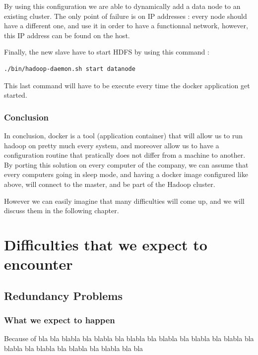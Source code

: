 \documentclass[11pt]{report} %
\begin{document}
By using this configuration we are able to dynamically add a data node to an existing cluster. The only point of failure is on IP addresses : every node should have a different one, and use it in order to have a functionnal network, however, this IP address can be found on the host.

Finally, the new slave have to start HDFS by using this command :
\begin{lstlisting}[language=bash]
./bin/hadoop-daemon.sh start datanode
\end{lstlisting}
This last command will have to be execute every time the docker application get started.

\section{Conclusion}
In conclusion, docker is a tool (application container) that will allow us to run hadoop on pretty much every system, and moreover allow us to have a configuration routine that pratically does not differ from a machine to another. By porting this solution on every computer of the company, we can assume that every computers going in sleep mode, and having a docker image configured like above, will connect to the master, and be part of the Hadoop cluster.

However we can easily imagine that many difficulties will come up, and we will discuss them in the following chapter.

\part{Difficulties that we expect to encounter}
\chapter{Redundancy Problems}
\section{What we expect to happen}
Because of bla bla blabla bla blabla bla blabla bla blabla bla blabla bla blabla bla blabla bla blabla bla blabla bla blabla bla bla
\end{document}

